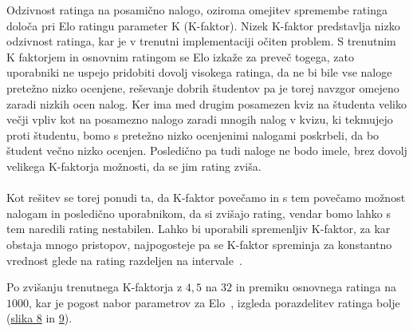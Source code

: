 \documentclass{IEEEtran}
\begin{document}
Odzivnost ratinga na posamično nalogo, oziroma omejitev spremembe ratinga določa pri Elo ratingu parameter K (K-faktor). Nizek K-faktor predstavlja
nizko odzivnost ratinga, kar je v trenutni implementaciji očiten problem. S trenutnim K faktorjem in osnovnim ratingom se Elo izkaže za preveč togega, zato uporabniki ne uspejo pridobiti dovolj visokega ratinga, da ne bi bile vse naloge pretežno nizko ocenjene, reševanje dobrih študentov pa je torej navzgor omejeno zaradi nizkih ocen nalog. Ker ima med drugim posamezen kviz na študenta veliko večji vpliv kot na posamezno nalogo zaradi mnogih nalog v kvizu, ki tekmujejo proti študentu, bomo s pretežno nizko ocenjenimi nalogami poskrbeli, da bo študent večno nizko ocenjen. Posledično pa tudi naloge ne bodo imele, brez dovolj velikega K-faktorja možnosti, da se jim rating zviša.
\hfill
\\
\\
Kot rešitev se torej ponudi ta, da K-faktor povečamo in s tem povečamo možnost nalogam in posledično uporabnikom, da si zvišajo rating, vendar bomo
lahko s tem naredili rating nestabilen. Lahko bi uporabili spremenljiv K-faktor, za kar obstaja mnogo pristopov, najpogosteje pa se K-faktor spreminja za konstantno vrednost glede na rating razdeljen na intervale~\cite{wiki}.

\newpage
Po zvišanju trenutnega K-faktorja z $4,5$ na $32$ in premiku osnovnega ratinga na $1000$, kar je pogost nabor parametrov za Elo~\cite{wiki}, 
izgleda porazdelitev ratinga bolje (\hyperref[fig:eloU]{slika 8} in \hyperref[fig:eloU]{9}). 
\end{document}
